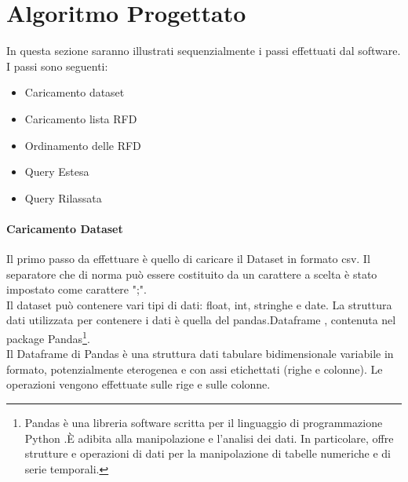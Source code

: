 \section{Algoritmo Progettato}
In questa sezione saranno illustrati sequenzialmente i passi effettuati dal software. I passi sono  seguenti:
\begin{itemize}[noitemsep]
    \item Caricamento dataset
    \item Caricamento lista RFD
    \item Ordinamento delle RFD
    \item Query Estesa
    \item Query Rilassata
\end{itemize}
\paragraph{Caricamento Dataset}
Il primo passo da effettuare è quello di caricare il Dataset in formato csv. Il separatore che di norma può essere costituito da un carattere a scelta è stato impostato come carattere ";".\\ Il dataset può contenere vari tipi di dati: float, int, stringhe e date.
La struttura dati utilizzata per contenere i dati è quella del pandas.Dataframe , contenuta nel package Pandas\footnote{Pandas è una libreria software scritta per il linguaggio di programmazione Python .È adibita alla manipolazione e l'analisi dei dati. In particolare, offre strutture e operazioni di dati per la manipolazione di tabelle numeriche e di serie temporali. }. \\Il Dataframe di Pandas è una struttura dati tabulare bidimensionale variabile in formato, potenzialmente eterogenea e con assi etichettati (righe e colonne). Le operazioni vengono effettuate sulle rige e sulle colonne. 
